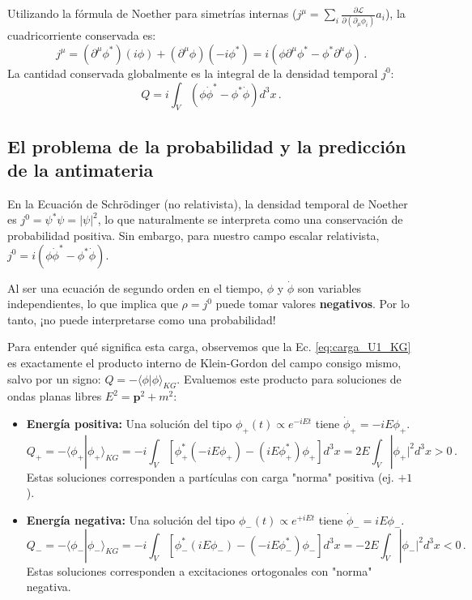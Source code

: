Utilizando la fórmula de Noether para simetrías internas ($j^\mu = \sum_i \frac{\partial \mathcal{L}}{\partial(\partial_\mu\phi_i)} a_i$), la cuadricorriente conservada es:
\begin{equation}
    j^\mu = (\partial^\mu\phi^*)(i\phi) + (\partial^\mu\phi)(-i\phi^*) = i (\phi \partial^\mu\phi^* - \phi^* \partial^\mu\phi) \, .
\end{equation}
La cantidad conservada globalmente es la integral de la densidad temporal $j^0$:
\begin{equation}
    Q = i \int_V \left( \phi \dot{\phi}^* - \phi^* \dot{\phi} \right) d^3x \, .
    \label{eq:carga_U1_KG}
\end{equation}

\subsection{El problema de la probabilidad y la predicción de la antimateria}

En la Ecuación de Schrödinger (no relativista), la densidad temporal de Noether es $j^0 = \psi^* \psi = |\psi|^2$, lo que naturalmente se interpreta como una conservación de probabilidad positiva. Sin embargo, para nuestro campo escalar relativista, $j^0 = i(\phi \dot{\phi}^* - \phi^* \dot{\phi})$. 

Al ser una ecuación de segundo orden en el tiempo, $\phi$ y $\dot{\phi}$ son variables independientes, lo que implica que $\rho = j^0$ puede tomar valores \textbf{negativos}. Por lo tanto, ¡no puede interpretarse como una probabilidad!

Para entender qué significa esta carga, observemos que la Ec. \eqref{eq:carga_U1_KG} es exactamente el producto interno de Klein-Gordon del campo consigo mismo, salvo por un signo: $Q = -\langle \phi | \phi \rangle_{KG}$. Evaluemos este producto para soluciones de ondas planas libres $E^2 = \mathbf{p}^2 + m^2$:

\begin{itemize}
    \item \textbf{Energía positiva:} Una solución del tipo $\phi_+(t) \propto e^{-iEt}$ tiene $\dot{\phi}_+ = -iE\phi_+$.
    \begin{equation}
        Q_+ = -\langle \phi_+ | \phi_+ \rangle_{KG} = -i \int_V \left[ \phi_+^* (-iE\phi_+) - (iE\phi_+^*) \phi_+ \right] d^3x = 2E \int_V |\phi_+|^2 d^3x > 0 \, .
    \end{equation}
    Estas soluciones corresponden a partículas con carga "norma" positiva (ej. $+1$).
    
    \item \textbf{Energía negativa:} Una solución del tipo $\phi_-(t) \propto e^{+iEt}$ tiene $\dot{\phi}_- = iE\phi_-$.
    \begin{equation}
        Q_- = -\langle \phi_- | \phi_- \rangle_{KG} = -i \int_V \left[ \phi_-^* (iE\phi_-) - (-iE\phi_-^*) \phi_- \right] d^3x = -2E \int_V |\phi_-|^2 d^3x < 0 \, .
    \end{equation}
    Estas soluciones corresponden a excitaciones ortogonales con "norma" negativa.
\end{itemize}

